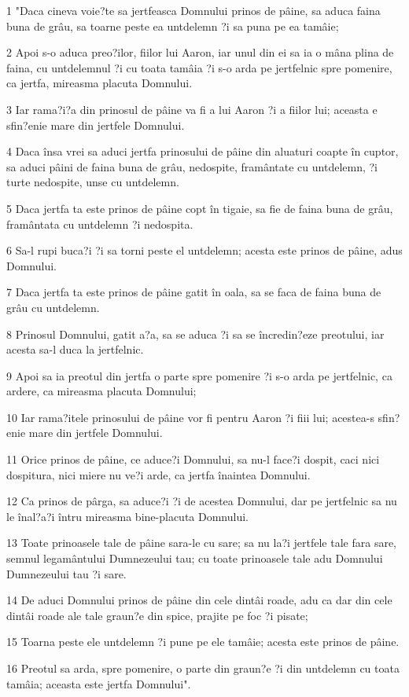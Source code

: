 \par 1 "Daca cineva voie?te sa jertfeasca Domnului prinos de pâine, sa aduca faina buna de grâu, sa toarne peste ea untdelemn ?i sa puna pe ea tamâie;
\par 2 Apoi s-o aduca preo?ilor, fiilor lui Aaron, iar unul din ei sa ia o mâna plina de faina, cu untdelemnul ?i cu toata tamâia ?i s-o arda pe jertfelnic spre pomenire, ca jertfa, mireasma placuta Domnului.
\par 3 Iar rama?i?a din prinosul de pâine va fi a lui Aaron ?i a fiilor lui; aceasta e sfin?enie mare din jertfele Domnului.
\par 4 Daca însa vrei sa aduci jertfa prinosului de pâine din aluaturi coapte în cuptor, sa aduci pâini de faina buna de grâu, nedospite, framântate cu untdelemn, ?i turte nedospite, unse cu untdelemn.
\par 5 Daca jertfa ta este prinos de pâine copt în tigaie, sa fie de faina buna de grâu, framântata cu untdelemn ?i nedospita.
\par 6 Sa-l rupi buca?i ?i sa torni peste el untdelemn; acesta este prinos de pâine, adus Domnului.
\par 7 Daca jertfa ta este prinos de pâine gatit în oala, sa se faca de faina buna de grâu cu untdelemn.
\par 8 Prinosul Domnului, gatit a?a, sa se aduca ?i sa se încredin?eze preotului, iar acesta sa-l duca la jertfelnic.
\par 9 Apoi sa ia preotul din jertfa o parte spre pomenire ?i s-o arda pe jertfelnic, ca ardere, ca mireasma placuta Domnului;
\par 10 Iar rama?itele prinosului de pâine vor fi pentru Aaron ?i fiii lui; acestea-s sfin?enie mare din jertfele Domnului.
\par 11 Orice prinos de pâine, ce aduce?i Domnului, sa nu-l face?i dospit, caci nici dospitura, nici miere nu ve?i arde, ca jertfa înaintea Domnului.
\par 12 Ca prinos de pârga, sa aduce?i ?i de acestea Domnului, dar pe jertfelnic sa nu le înal?a?i întru mireasma bine-placuta Domnului.
\par 13 Toate prinoasele tale de pâine sara-le cu sare; sa nu la?i jertfele tale fara sare, semnul legamântului Dumnezeului tau; cu toate prinoasele tale adu Domnului Dumnezeului tau ?i sare.
\par 14 De aduci Domnului prinos de pâine din cele dintâi roade, adu ca dar din cele dintâi roade ale tale graun?e din spice, prajite pe foc ?i pisate;
\par 15 Toarna peste ele untdelemn ?i pune pe ele tamâie; acesta este prinos de pâine.
\par 16 Preotul sa arda, spre pomenire, o parte din graun?e ?i din untdelemn cu toata tamâia; aceasta este jertfa Domnului".

